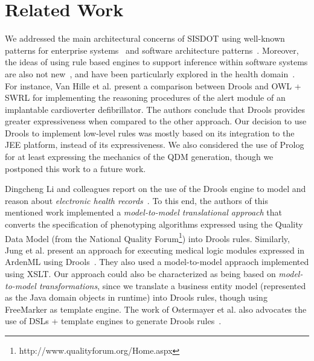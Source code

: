\section{Related Work}
\label{sec:related_works}

We addressed the main architectural concerns of SISDOT 
using well-known patterns for enterprise
systems~\cite{enterprise-patterns:book} and
software architecture patterns~\cite{pattern-oriented:book}.
Moreover, the ideas of using rule based engines to support
inference within software systems are also not new~\cite{ORDONEZ2016353,li2012modeling},
and have been particularly explored in the health
domain~\cite{mantas2012comparing,li2012modeling,jung2011executing}.
For instance, Van Hille et al. present a comparison
between Drools and OWL + SWRL for implementing the reasoning
procedures of the alert module of an implantable
cardioverter defibrillator. The authors conclude that
Drools provides greater expressiveness when compared to the other
approach. Our decision to use Drools to implement
low-level rules was mostly based on its integration to
the JEE platform, instead of its expressiveness.
We also considered the use of Prolog for at least
expressing the mechanics of the QDM generation, though
we postponed this work to a future work.

Dingcheng Li and colleagues report on the use of the
Drools engine to model and reason about \emph{electronic
  health records}~\cite{li2012modeling}. To this end,
the authors of this mentioned work implemented a
\emph{model-to-model translational approach} that
converts the specification of phenotyping algorithms 
expressed using the Quality Data Model (from the National
Quality Forum\footnote{http://www.qualityforum.org/Home.aspx})
into Drools rules. Similarly, Jung et al. present an approach
for executing medical logic modules expressed in ArdenML
using Drools~\cite{jung2011executing}. They also used a model-to-model appraoch
implemented using XSLT. Our approach could also be characterized
as being based on \emph{model-to-model transformations}, since we translate
a business entity model (represented as the \callers Java
domain objects in runtime) into Drools rules, though using FreeMarker as 
template engine. The work of Ostermayer et al. also advocates
the use of DSLs + template engines to generate Drools
rules~\cite{toostermayer2013simplifying}.

